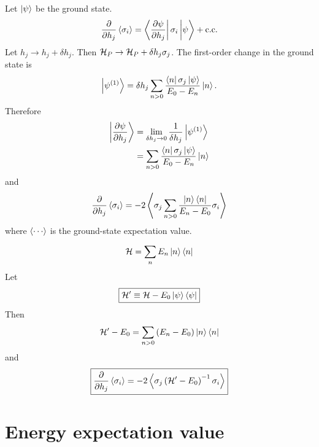 Let $\left| \psi \right>$ be the ground state.
\begin{equation}
  \pd{}{h_j} \avg{\sigma_i}
  = \matrixel{\pd{\psi}{h_j}}{\sigma_i}{\psi} + \cc
  \label{}
\end{equation}
Let
$h_j \rightarrow h_j + \delta h_j$.
Then
$\mathcal{H}_P \rightarrow \mathcal{H}_P + \delta h_j \sigma_j$.
The first-order change in the ground state is
\begin{equation}
  \ket{\psi^{(1)}}
  = \delta h_j \sum_{n>0} \frac{\matrixel{n}{\sigma_j}{\psi}}{E_0 - E_n} \ket{n}.
  \label{}
\end{equation}
Therefore
\begin{align}
  \ket{\pd{\psi}{h_j}}
  &= \lim_{\delta h_j \rightarrow 0} \frac{1}{\delta h_j} \ket{\psi^{(1)}} \\
  &= \sum_{n>0} \frac{\matrixel{n}{\sigma_j}{\psi}}{E_0 - E_n} \ket{n}
  \label{}
\end{align}
and
\begin{equation}
  \frac{\partial }{\partial h_j} \left< \sigma_i \right>
  = -2 \left< \sigma_j \sum_{n>0} \frac{\left| n \right> \left< n \right|}{E_n - E_0} \sigma_i \right>
  \label{}
\end{equation}
where $\avg{\cdots}$ is the ground-state expectation value.

\begin{equation}
  \mathcal{H} = \sum_n E_n \left| n \right> \left< n \right|
  \label{}
\end{equation}
Let
\begin{equation}
  \boxed{
  \mathcal{H}^{\prime} \equiv \mathcal{H} - E_0 \left| \psi \right> \left< \psi \right|
  }
  \label{}
\end{equation}
Then
\begin{equation}
  \mathcal{H}^{\prime} - E_0 = \sum_{n>0} \left( E_n - E_0 \right) \left| n \right> \left< n \right|
  \label{}
\end{equation}
and
\begin{equation}
  \boxed{
  \frac{\partial }{\partial h_j} \left< \sigma_i \right>
  = -2 \left< \sigma_j \left( \mathcal{H}^{\prime} - E_0 \right)^{-1} \sigma_i \right>
  }
  \label{}
\end{equation}

\section*{Energy expectation value}

